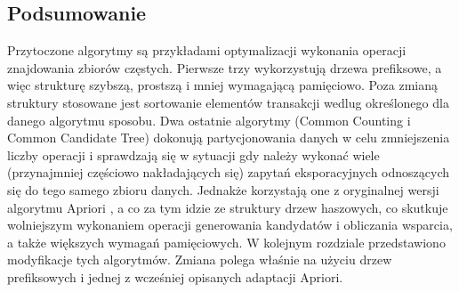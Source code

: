 \subsection{Podsumowanie}
\label{c327}
Przytoczone algorytmy są przykładami optymalizacji wykonania operacji znajdowania zbiorów częstych. Pierwsze trzy wykorzystują drzewa prefiksowe, a więc strukturę szybszą, prostszą i mniej wymagającą pamięciowo. Poza zmianą struktury stosowane jest sortowanie elementów transakcji wedlug określonego dla danego algorytmu sposobu. Dwa ostatnie algorytmy (Common Counting i Common Candidate Tree) dokonują partycjonowania danych w celu zmniejszenia liczby operacji i sprawdzają się w sytuacji gdy należy wykonać wiele (przynajmniej częściowo nakładających się) zapytań eksporacyjnych odnoszących się do tego samego zbioru danych. Jednakże korzystają one z oryginalnej wersji algorytmu Apriori \cite{Agrawal}, a co za tym idzie ze struktury drzew haszowych, co skutkuje wolniejszym wykonaniem operacji generowania kandydatów i obliczania wsparcia, a także większych wymagań pamięciowych. W kolejnym rozdziale przedstawiono modyfikacje tych algorytmów. Zmiana polega właśnie na użyciu drzew prefiksowych i jednej z wcześniej opisanych adaptacji Apriori.